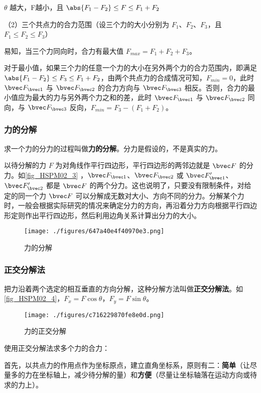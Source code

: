 $\theta$ 越大，F越小，且 $\abs{F_1-F_2}\leq F\leq F_1+F_2$

（2）三个共点力的合力范围（设三个力的大小分别为 $F_1$、$F_2$、$F_3$，且 $F_1\leq F_2 \leq F_3$）

易知，当三个力同向时，合力有最大值 $F_{max}=F_1+F_2+F_3$。

对于最小值，如果三个力的任意一个力的大小在另外两个力的合力范围内，即满足 $\abs{F_1-F_2}\leq F_3\leq F_1+F_2$，由两个共点力的合成情况可知，$F_{min}=0$，此时 $\bvec F_{\bvec 1}$ 与 $\bvec F_{\bvec 2}$ 的合力方向与 $\bvec F_{\bvec 3}$ 相反。否则，合力的最小值应为最大的力与另外两个力之和的差，此时 $\bvec F_{\bvec 1}$ 与 $\bvec F_{\bvec 2}$ 同向，与 $\bvec F_{\bvec 3}$ 反向，$F_{min}=F_3-(F_1+F_2)$。

\subsubsection{力的分解}
求一个力的分力的过程叫做\textbf{力的分解}。分力是假设的，不是真实的力。

以待分解的力 $F$ 为对角线作平行四边形，平行四边形的两邻边就是 $\bvec F$ 的分力。如\autoref{fig_HSPM02_3} ，$\bvec F_{\bvec 1}$、$\bvec F_{\bvec 2}$ 或 $\bvec F_{\bvec 1}'$、$\bvec F_{\bvec 2}'$ 都是 $\bvec F$ 的两个分力。这也说明了，只要没有限制条件，对给定的同一个力 $\bvec F$ 可以分解成无数对大小、方向不同的分力。分解某个力时，一般会根据实际研究的情况来确定分力的方向，再沿着分力方向根据平行四边形定则作出平行四边形，然后利用边角关系计算出分力的大小。
\begin{figure}[ht]
\centering
\texttt{[image: ./figures/647a40e4f40970e3.png]}
\caption{力的分解} \label{fig_HSPM02_3}
\end{figure}

\subsubsection{正交分解法}
把力沿着两个选定的相互垂直的方向分解，这种分解方法叫做\textbf{正交分解法}。如\autoref{fig_HSPM02_4}，$F_{x}=F\cos\theta$，$F_{y}=F\sin\theta$。
\begin{figure}[ht]
\centering
\texttt{[image: ./figures/c716229870fe8e0d.png]}
\caption{力的正交分解} \label{fig_HSPM02_4}
\end{figure}

使用正交分解法求多个力的合力：

首先，以共点力的作用点作为坐标原点，建立直角坐标系，原则有二：\textbf{简单}（让尽量多的力在坐标轴上，减少待分解的量）和\textbf{方便}（尽量让坐标轴落在运动方向或待求的力上）。

